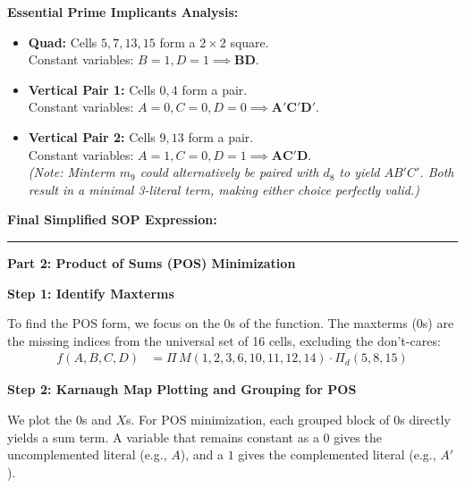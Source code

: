 \documentclass[12pt,a3paper]{article}
\begin{document}
\begin{enumerate}
\begin{tcolorbox}[enhanced,breakable,ansbox,colback=cC!4,colframe=cC,boxrule=0.8pt,arc=5pt,title={\textbf{Answer}},fonttitle=\bfseries\color{white},colbacktitle=cC]
\textbf{Essential Prime Implicants Analysis:}
\begin{itemize}
    \item \textbf{Quad:} Cells $5, 7, 13, 15$ form a $2 \times 2$ square. \\
    Constant variables: $B=1, D=1 \implies \mathbf{BD}$.
    \item \textbf{Vertical Pair 1:} Cells $0, 4$ form a pair. \\
    Constant variables: $A=0, C=0, D=0 \implies \mathbf{A'C'D'}$.
    \item \textbf{Vertical Pair 2:} Cells $9, 13$ form a pair. \\
    Constant variables: $A=1, C=0, D=1 \implies \mathbf{AC'D}$. \\
    \textit{(Note: Minterm $m_9$ could alternatively be paired with $d_8$ to yield $AB'C'$. Both result in a minimal 3-literal term, making either choice perfectly valid.)}
\end{itemize}

\vspace{0.5em}
\textbf{Final Simplified SOP Expression:}
\begin{center}
\end{center}

\vspace{1.5em}
\rule{\textwidth}{0.4pt}
\vspace{1.5em}

\textbf{\large Part 2: Product of Sums (POS) Minimization}

\vspace{0.5em}
\textbf{Step 1: Identify Maxterms}

To find the POS form, we focus on the $0$s of the function. The maxterms ($0$s) are the missing indices from the universal set of 16 cells, excluding the don't-cares:
\begin{align*}
    f(A,B,C,D) &= \Pi\,M(1,2,3,6,10,11,12,14) \cdot \Pi_d(5,8,15)
\end{align*}

\vspace{0.5em}
\textbf{Step 2: Karnaugh Map Plotting and Grouping for POS}

We plot the $0$s and $X$s. For POS minimization, each grouped block of $0$s directly yields a sum term. A variable that remains constant as a $0$ gives the uncomplemented literal (e.g., $A$), and a $1$ gives the complemented literal (e.g., $A'$).


\end{tcolorbox}
\end{enumerate}
\end{document}
